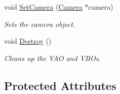 \begin{CompactItemize}
void \hyperlink{class_model_19b6689d4a5e80e187df85a5ab6f03b8}{SetCamera} (\hyperlink{class_camera}{Camera} $\ast$camera)
\begin{CompactList}\small\item\em Sets the camera object. \item\end{CompactList}\item 
void \hyperlink{class_model_d60ed0ed7eaa7dcdd58398e6efacc7c4}{Destroy} ()
\begin{CompactList}\small\item\em Cleans up the VAO and VBOs. \item\end{CompactList}\end{CompactItemize}
\subsection*{Protected Attributes}
